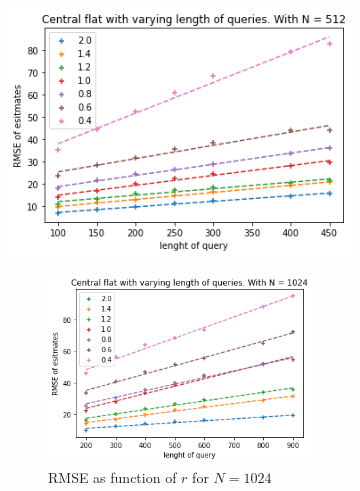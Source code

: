 \documentclass[11pt]{article}
\theoremstyle{definition}
\begin{document}
\begin{figure}[H]
\begin{subfigure}{.4\textwidth}
  \includegraphics[width=\linewidth]{figures/central_flat/varying_r/cen_flat_varying_length_N_linear_=512.png}
  \caption{RMSE as function of $r$ for $N=512$}
  \label{fig:10}
  \begin{subfigure}{\textwidth}
  \centering
  \includegraphics[width=\linewidth]{figures/central_flat/varying_r/cen_flat_varying_length_N_linear_=1024.png}
  \caption{RMSE as function of $r$ for $N=1024$}
  \label{fig:11}
\end{subfigure}
\begin{subfigure}{\textwidth}
  \centering

\end{subfigure}
\end{subfigure}
\end{figure}
\end{document}
